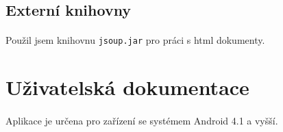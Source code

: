 \documentclass[12pt,a4paper,titlepage]{article}
\begin{document}
	\subsection{Externí knihovny}{
	\paragraph{}
	Použil jsem knihovnu \texttt{jsoup.jar} pro práci s html dokumenty. 
	
\pagebreak
\section{Uživatelská dokumentace}
	\paragraph{}
	Aplikace je určena pro zařízení se systémem Android 4.1 a vyšší.
	
}
\end{document}
